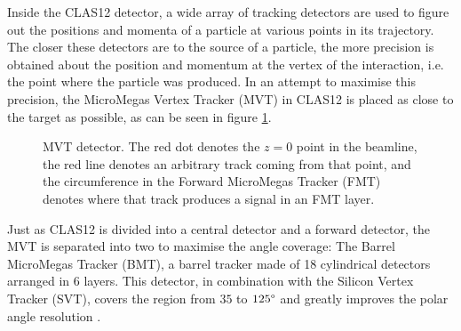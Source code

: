     Inside the CLAS12 detector, a wide array of tracking detectors are used to figure out the positions and momenta of a particle at various points in its trajectory.
    The closer these detectors are to the source of a particle, the more precision is obtained about the position and momentum at the vertex of the interaction, i.e. the point where the particle was produced.
    In an attempt to maximise this precision, the MicroMegas Vertex Tracker (MVT) in CLAS12 is placed as close to the target as possible, as can be seen in figure \ref{fig::mvt}.
    
    \begin{figure}[b!]
        \centering{}
        \caption[MVT detector.]{MVT detector. The red dot denotes the $z=0$ point in the beamline, the red line denotes an arbitrary track coming from that point, and the circumference in the Forward MicroMegas Tracker (FMT) denotes where that track produces a signal in an FMT layer.}
        \label{fig::mvt}
    \end{figure}

    Just as CLAS12 is divided into a central detector and a forward detector, the MVT is separated into two to maximise the angle coverage:
    The Barrel MicroMegas Tracker (BMT), a barrel tracker made of 18 cylindrical detectors arranged in 6 layers.
    This detector, in combination with the Silicon Vertex Tracker (SVT), covers the region from $35$ to $125\degree$ and greatly improves the polar angle resolution \cite{acker2020mvt}.

